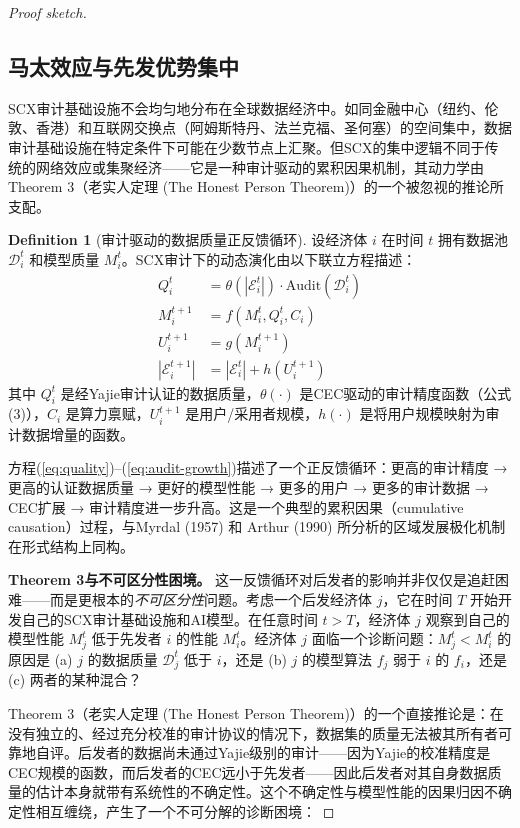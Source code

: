 \documentclass[12pt,a4paper]{ctexart}
\theoremstyle{definition}
\newtheorem{definition}{Definition}[section]
\theoremstyle{remark}
\begin{document}
\begin{proof}[Proof sketch]
\subsection{马太效应与先发优势集中}

SCX审计基础设施不会均匀地分布在全球数据经济中。如同金融中心（纽约、伦敦、香港）和互联网交换点（阿姆斯特丹、法兰克福、圣何塞）的空间集中，数据审计基础设施在特定条件下可能在少数节点上汇聚。但SCX的集中逻辑不同于传统的网络效应或集聚经济——它是一种审计驱动的累积因果机制，其动力学由Theorem 3（老实人定理 (The Honest Person Theorem)）的一个被忽视的推论所支配。

\begin{definition}[审计驱动的数据质量正反馈循环]
设经济体 $i$ 在时间 $t$ 拥有数据池 $\mathcal{D}_i^t$ 和模型质量 $M_i^t$。SCX审计下的动态演化由以下联立方程描述：
\begin{align}
Q_i^t &= \theta(|\mathcal{E}_i^t|) \cdot \text{Audit}(\mathcal{D}_i^t) \label{eq:quality}\\
M_i^{t+1} &= f(M_i^t, Q_i^t, C_i) \label{eq:model}\\
U_i^{t+1} &= g(M_i^{t+1}) \label{eq:users}\\
|\mathcal{E}_i^{t+1}| &= |\mathcal{E}_i^t| + h(U_i^{t+1}) \label{eq:audit-growth}
\end{align}
其中 $Q_i^t$ 是经Yajie审计认证的数据质量，$\theta(\cdot)$ 是CEC驱动的审计精度函数（公式(3)），$C_i$ 是算力禀赋，$U_i^{t+1}$ 是用户/采用者规模，$h(\cdot)$ 是将用户规模映射为审计数据增量的函数。
\end{definition}

方程(\ref{eq:quality})–(\ref{eq:audit-growth})描述了一个正反馈循环：更高的审计精度 → 更高的认证数据质量 → 更好的模型性能 → 更多的用户 → 更多的审计数据 → CEC扩展 → 审计精度进一步升高。这是一个典型的累积因果（cumulative causation）过程，与Myrdal (1957) 和 Arthur (1990) 所分析的区域发展极化机制在形式结构上同构。

\textbf{Theorem 3与不可区分性困境。} 这一反馈循环对后发者的影响并非仅仅是追赶困难——而是更根本的\textit{不可区分性}问题。考虑一个后发经济体 $j$，它在时间 $T$ 开始开发自己的SCX审计基础设施和AI模型。在任意时间 $t > T$，经济体 $j$ 观察到自己的模型性能 $M_j^t$ 低于先发者 $i$ 的性能 $M_i^t$。经济体 $j$ 面临一个诊断问题：$M_j^t < M_i^t$ 的原因是 (a) $j$ 的数据质量 $\mathcal{D}_j^t$ 低于 $i$，还是 (b) $j$ 的模型算法 $f_j$ 弱于 $i$ 的 $f_i$，还是 (c) 两者的某种混合？

Theorem 3（老实人定理 (The Honest Person Theorem)）的一个直接推论是：在没有独立的、经过充分校准的审计协议的情况下，数据集的质量无法被其所有者可靠地自评。后发者的数据尚未通过Yajie级别的审计——因为Yajie的校准精度是CEC规模的函数，而后发者的CEC远小于先发者——因此后发者对其自身数据质量的估计本身就带有系统性的不确定性。这个不确定性与模型性能的因果归因不确定性相互缠绕，产生了一个不可分解的诊断困境：


\end{proof}
\end{document}
